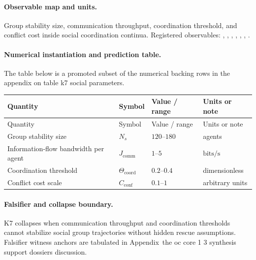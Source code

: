 \paragraph{Observable map and units.}
Group stability size, communication throughput, coordination threshold, and conflict cost inside social coordination continua.
Registered observables: , \allowbreak {}, \allowbreak {}, \allowbreak {}, \allowbreak {}, \allowbreak {}, \allowbreak {}.

\paragraph{Numerical instantiation and prediction table.}
The table below is a promoted subset of the numerical backing rows in the appendix on table k7 social parameters.
\begin{longtable}{@{}L{0.27\textwidth}L{0.15\textwidth}L{0.24\textwidth}L{0.16\textwidth}@{}}
\toprule
Quantity & Symbol & Value / range & Units or note \\
\midrule
\endfirsthead
\toprule
Quantity & Symbol & Value / range & Units or note \\
\midrule
\endhead
Group stability size & $\scriptstyle N_s$ & $120\text{--}180$ & agents \\
Information-flow bandwidth per agent & $\scriptstyle J_{\mathrm{comm}}$ & $1\text{--}5$ & $\mathrm{bits/s}$ \\
Coordination threshold & $\scriptstyle \Theta_{\mathrm{coord}}$ & $0.2\text{--}0.4$ & dimensionless \\
Conflict cost scale & $\scriptstyle C_{\mathrm{conf}}$ & $0.1\text{--}1$ & arbitrary units \\
\bottomrule
\end{longtable}

\paragraph{Falsifier and collapse boundary.}
K7 collapses when communication throughput and coordination thresholds cannot stabilize social group trajectories without hidden rescue assumptions.
Falsifier witness anchors are tabulated in Appendix~the oc core 1 3 synthesis support dossiers discussion.

